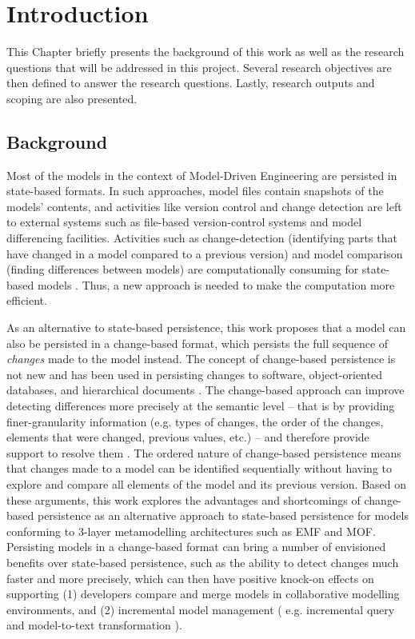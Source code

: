 \chapter{Introduction}
\label{ch:introduction}
This Chapter briefly presents the background of this work as well as the research questions that will be 
addressed in this project. Several research objectives are then defined to answer the research questions. 
Lastly, research outputs and scoping are also presented. 

\section{Background}
\label{sec:background}
Most of the models in the context of Model-Driven Engineering are persisted in state-based formats. 
In such approaches, model files contain snapshots of the models' contents, and activities like version control 
and change detection are left to external systems such as file-based version-control systems and model differencing 
facilities. Activities such as change-detection (identifying parts that have changed in a model compared 
to a previous version) and model comparison (finding differences between models) are computationally consuming
for state-based models \cite{Kolovos:2009:DMM:1564596.1564641}. Thus, a new approach is needed to make the 
computation more efficient.

As an alternative to state-based persistence, this work proposes that a model can also be persisted in a change-based format, 
which persists the full sequence of \emph{changes} made to the model instead. 
The concept of change-based persistence is not new and has been used in persisting changes to software, 
object-oriented databases, and hierarchical documents 
\cite{DBLP:journals/entcs/RobbesL07,DBLP:conf/sde/LippeO92,DBLP:conf/caise/IgnatN05}. 
The change-based approach can improve detecting differences more precisely at the semantic 
level -- that is by providing finer-granularity information (e.g. types of changes, the order of the changes, 
elements that were changed, previous values, etc.) -- and therefore provide support to resolve them \cite{mens2002state}. 
The ordered nature of change-based persistence means that changes made to a model can be identified sequentially without 
having to explore and compare all elements of the model and its previous version. Based on these arguments, 
this work explores the advantages and shortcomings of change-based persistence as an alternative approach to 
state-based persistence for models conforming to 3-layer metamodelling architectures such as EMF and MOF. 
Persisting models in a change-based format can bring a number of envisioned benefits over state-based persistence, 
such as the ability to detect changes much faster and more precisely, which can then have positive 
knock-on effects on supporting (1) developers compare and merge models in collaborative modelling environments, 
and (2) incremental model management ( e.g. incremental query \cite{DBLP:conf/ecmdafa/RathHV12} and 
model-to-text transformation \cite{DBLP:conf/ecmdafa/OgunyomiRK15}). 


